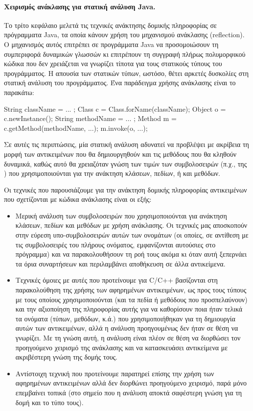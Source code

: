 \paragraph*{Χειρισμός ανάκλασης για στατική ανάλυση {\en Java}.}
Το τρίτο κεφάλαιο μελετά τις τεχνικές ανάκτησης δομικής πληροφορίας σε
πρόγραμματα {\en Java}, τα οποία κάνουν χρήση του μηχανισμού ανάκλασης
({\en reflection}).  Ο μηχανισμός αυτός επιτρέπει σε προγράμματα {\en
  Java} να προσομοιώσουν τη συμπεριφορά δυναμικών γλωσσών κι
επιτρέπουν τη συγγραφή πλήρως πολυμορφικού κώδικα που δεν χρειάζεται
να γνωρίζει τίποτα για τους στατικούς τύπους του προγράμματος. Η
απουσία των στατικών τύπων, ωστόσο, θέτει αρκετές δυσκολίες στη
στατική ανάλυση του προγράμματος. Ένα παράδειγμα χρήσης ανάκλασης
είναι το παρακάτω:
{\en
  \begin{javacodelinum}
    String className = ... ;
    Class c = Class.forName(className);
    Object o = c.newInstance();
    String methodName = ... ;
    Method m = c.getMethod(methodName, ...);
    m.invoke(o, ...);
  \end{javacodelinum}
}

Σε αυτές τις περιπτώσεις, μία στατική ανάλυση αδυνατεί να προβλέψει με
ακρίβεια τη μορφή των αντικειμένων που θα δημιουργηθούν και τις μεθόδους
που θα κληθούν δυναμικά, καθώς αυτό θα χρειαζόταν γνώση των τιμών των
συμβολοσειρών (π.χ., της {\en {}}) που χρησιμοποιούνται
για την ανάκτηση κλάσεων, πεδίων, ή και μεθόδων.

Οι τεχνικές που παρουσιάζουμε για την ανάκτηση δομικής πληροφορίας
αντικειμένων που σχετίζονται με κώδικα ανάκλασης είναι οι εξής:
\begin{itemize}
\item Μερική ανάλυση των συμβολοσειρών που χρησιμοποιούνται για
  ανάκτηση κλάσεων, πεδίων και μεθόδων με χρήση ανάκλασης. Οι τεχνικές
  μας αποσκοπούν στην εύρεση υπο-συμβολοσειρών αυτών των ονομάτων (οι
  οποίες, σε αντίθεση με τις συμβολοσειρές του πλήρους ονόματος,
  εμφανίζονται αυτούσιες στο πρόγραμμα) και να παρακολουθήσουν τη ροή
  τους ακόμα κι όταν αυτή ξεπερνάει τα όρια συναρτήσεων και
  περιλαμβάνει αποθήκευση σε άλλα αντικείμενα.
\item Τεχνικές όμοιες με αυτές που προτείνουμε για {\en C/C++}
  βασίζονται στη παρακολούθηση της χρήσης των αφηρημένων αντικειμένων,
  ως προς τους τύπους με τους οποίους χρησιμοποιούνται (και τα πεδία ή
  μεθόδους που προσπελαύνουν) και την αξιοποίηση της πληροφορίας αυτής
  για να καθορίσουν ποια ήταν τελικά τα ονόματα (τύπων, μεθόδων, κ.ά.)
  που χρησιμοποιήθηκαν για τη δημιουργία αυτών των αντικειμένων, αλλά
  η ανάλυση προηγουμένως δεν ήταν σε θέση να γνωρίζει. Με τη γνώση
  αυτή, η ανάλυση είναι πλέον σε θέση να διορθώσει τον προηγούμενο
  χειρισμό της ανάκλασης και να κατασκευάσει αντικείμενα με
  ακριβέστερη γνώση της δομής τους.
\item Αντίστοιχη τεχνική που προτείνουμε παρατηρεί επίσης την χρήση
  των αφηρημένων αντικειμένων αλλά δεν διορθώνει προηγούμενο χειρισμό,
  παρά μόνο επεμβαίνει τοπικά (στο σημείο που η ανάλυση αποκτά
  σαφέστερη γνώση για τη δομή και το τύπο τους).
\end{itemize}

